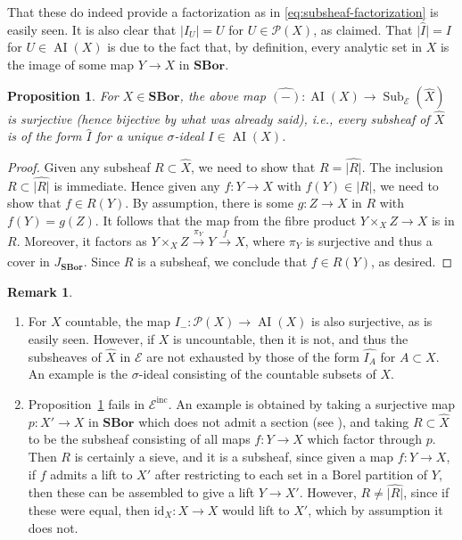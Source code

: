 \documentclass[11pt]{amsart}
\newcommand\abs[2][]{#1\lvert{#2}#1\rvert}
\newcommand\AI{\operatorname{AI}}
\newcommand\cE{\mathcal{E}}
\newcommand\enumbelow{\ }
\newcommand\id{\mathrm{id}}
\newcommand\inc{\mathrm{inc}}
\newcommand\pow{\mathcal{P}}
\newcommand\SBor{\mathbf{SBor}}
\newcommand\Sub{\operatorname{Sub}}
\newcommand\tox[2][]{\xrightarrow[#1]{#2}}
\newcommand\wh[1]{\widehat{#1}}
\theoremstyle{definition}
\newtheorem{rmk}[defn]{Remark}
\theoremstyle{remark}
\theoremstyle{plain}
\newtheorem{propn}[defn]{Proposition}
\begin{document}
That these do indeed provide a factorization as in \eqref{eq:subsheaf-factorization} is easily seen.
It is also clear that \( \abs{I_U} = U \) for \( U \in \pow(X) \), as claimed.
That \( \abs{\wh{I}} = I \) for \( U \in\AI(X) \) is due to the fact that, by definition, every analytic set in \( X \) is the image of some map \( Y \to X \) in \( \SBor \).

\begin{propn}\label{propn:subsheaves-in-e}
  For \( X \in \SBor \), the above map \( \wh{(-)} \colon \AI(X) \to \Sub_{\cE}(\wh X) \) is surjective (hence bijective by what was already said), i.e., every subsheaf of \( \wh X \) is of the form \( \wh I \) for a unique \( \sigma \)-ideal \( I \in \AI(X) \).
\end{propn}

\begin{proof}
  Given any subsheaf \( R \subset \wh X \), we need to show that \( R = \wh{\abs{R}} \).
  The inclusion \( R \subset \wh{\abs{R}} \) is immediate.
  Hence given any \( f \colon Y \to X \) with \( f(Y) \in \abs{R} \), we need to show that \( f \in R(Y) \).
  By assumption, there is some \( g \colon Z \to X \) in \( R \) with \( f(Y) = g(Z) \).
  It follows that the map from the fibre product \( Y \times_X Z \to X \) is in \( R \).
  Moreover, it factors as \( Y \times_X Z \tox{\pi_Y} Y \tox{f} X \), where \( \pi_Y \) is surjective and thus a cover in \( J_{\SBor} \).
  Since \( R \) is a subsheaf, we conclude that \( f \in R(Y) \), as desired.
\end{proof}

\begin{rmk}\label{rmk:subsheaf-counterexamples}\enumbelow
  \begin{enumerate}
  \item For \( X \) countable, the map \( I_- \colon \pow(X) \to \AI(X) \) is also surjective, as is easily seen.
    However, if \( X \) is uncountable, then it is not, and thus the subsheaves of \( \wh X \) in \( \cE \) are not exhausted by those of the form \( \wh{I_A} \) for \( A \subset X \).
    An example is the \( \sigma \)-ideal consisting of the countable subsets of \( X \).
  \item Proposition~\ref{propn:subsheaves-in-e} fails in \( \cE^\inc \).
    An example is obtained by taking a surjective map \( p \colon X' \to X \) in \( \SBor \) which does not admit a section (see \cite[Exercise~18.17]{kechris-classical}),
    and taking \( R \subset \wh X \) to be the subsheaf consisting of all maps \( f \colon Y \to X \) which factor through \( p \).
    Then \( R \) is certainly a sieve, and it is a subsheaf, since given a map \( f \colon Y \to X \), if \( f \) admits a lift to \( X' \) after restricting to each set in a Borel partition of \( Y \), then these can be assembled to give a lift \( Y \to X' \).
    However, \( R \ne \wh{\abs{R}} \), since if these were equal, then \( \id_X \colon X \to X \) would lift to \( X' \), which by assumption it does not.
  \end{enumerate}
\end{rmk}
\end{document}
